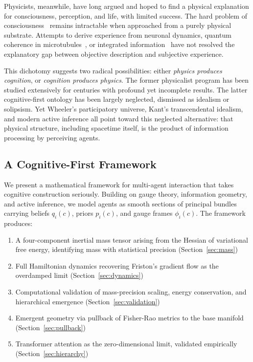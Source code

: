 \documentclass[11pt]{article}
\begin{document}
Physicists, meanwhile, have long argued and hoped to find a physical explanation for consciousness, perception, and life, with limited success. The hard problem of consciousness~\cite{Chalmers1995} remains intractable when approached from a purely physical substrate. Attempts to derive experience from neuronal dynamics, quantum coherence in microtubules~\cite{HameroffPenrose1996}, or integrated information~\cite{Tononi2008} have not resolved the explanatory gap between objective description and subjective experience.

This dichotomy suggests two radical possibilities: either \emph{physics produces cognition}, or \emph{cognition produces physics}. The former physicalist program has been studied extensively for centuries with profound yet incomplete results. The latter cognitive-first ontology has been largely neglected, dismissed as idealism or solipsism. Yet Wheeler's participatory universe, Kant's transcendental idealism, and modern active inference all point toward this neglected alternative: that physical structure, including spacetime itself, is the product of information processing by perceiving agents.

\subsection{A Cognitive-First Framework}

We present a mathematical framework for multi-agent interaction that takes cognitive construction seriously. Building on gauge theory, information geometry, and active inference, we model agents as smooth sections of principal bundles carrying beliefs $q_i(c)$, priors $p_i(c)$, and gauge frames $\phi_i(c)$. The framework produces:
\begin{enumerate}
\item A four-component inertial mass tensor arising from the Hessian of variational free energy, identifying mass with statistical precision (Section~\ref{sec:mass})
\item Full Hamiltonian dynamics recovering Friston's gradient flow as the overdamped limit (Section~\ref{sec:dynamics})
\item Computational validation of mass-precision scaling, energy conservation, and hierarchical emergence (Section~\ref{sec:validation})
\item Emergent geometry via pullback of Fisher-Rao metrics to the base manifold (Section~\ref{sec:pullback})
\item Transformer attention as the zero-dimensional limit, validated empirically (Section~\ref{sec:hierarchy})
\end{enumerate}
\end{document}
